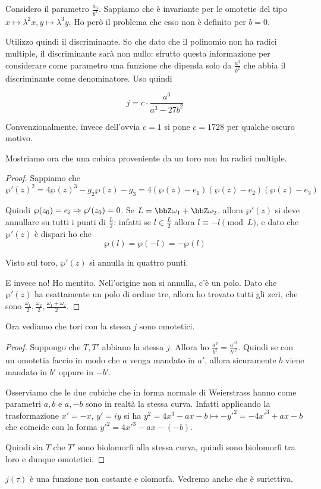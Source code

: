 	Considero il parametro $\frac{a_3}{b^2}$. Sappiamo che è invariante per le omotetie del tipo $x\mapsto \lambda^2x, y\mapsto\lambda^3y$. Ho però il problema che esso non è definito per $b=0$.

	Utilizzo quindi il discriminante. So che dato che il polinomio non ha radici multiple, il discriminante sarà non nullo: sfrutto questa informazione per considerare come parametro una funzione che dipenda solo da $\frac{a^3}{b^2}$ che abbia il discriminante come denominatore. Uso quindi
	
	\[
		j = c \cdot \frac {a^3}{a^3-27b^2}
	\]

	Convenzionalmente, invece dell'ovvia $c=1$ si pone $c=1728$ per qualche oscuro motivo.
	
	Mostriamo ora che una cubica proveniente da un toro non ha radici multiple.
	
	\begin{proof}
		Sappiamo che 
		\[
			\wp'(z)^2=4\wp(z)^3-g_2\wp(z)-g_3 = 4(\wp(z)-e_1)(\wp(z)-e_2)(\wp(z)-e_3)
		\]
		
		Quindi $\wp(z_0)=e_i \Rightarrow\wp'(z_0)=0$.
		Se $L=\bbZ\omega_1 + \bbZ\omega_2$, allora $\wp'(z)$ si deve annullare su tutti i punti di $\frac L2$: infatti se $l \in \frac L2$ allora $l \equiv -l \pmod L$, e dato che $\wp'(z)$ è dispari ho che 
		\[
			\wp(l) = \wp(-l) = -\wp(l)
		\]
		
		Visto sul toro, $\wp'(z)$ si annulla in quattro punti.
		
		E invece no! Ho mentito. Nell'origine non si annulla, c'è un polo. Dato che $\wp'(z)$ ha esattamente un polo di ordine tre, allora ho trovato tutti gli zeri, che sono $\frac{\omega_1}2, \frac{\omega_2}2, \frac{\omega_1+\omega_2}2$.
		

	\end{proof}

	Ora vediamo che tori con la stessa $j$ sono omotetici.
	
	\begin{proof}
          Suppongo che $T, T'$ abbiano la stessa $j$. Allora ho $\frac{a^3}{b^2}=\frac{a'^3}{b'^2}$. Quindi se con un omotetia faccio in modo che $a$ venga mandato in $a'$, allora sicuramente $b$ viene mandato in $b'$ oppure in $-b'$.

          Osserviamo che le due cubiche che in forma normale di Weierstrass hanno come parametri $a, b$ e $a, -b$ sono in realtà la stessa curva. Infatti applicando la trasformazione $x' = -x$, $y' = iy$ si ha $y^2 = 4x^3 - ax - b \mapsto - y'^2 = - 4x'^3 + ax - b$ che coincide con la forma $y'^2 = 4x'^3 - ax - (-b)$.
		
          Quindi sia $T$ che $T'$ sono biolomorfi alla stessa curva, quindi sono biolomorfi tra loro e dunque omotetici.
	\end{proof}
	
	\begin{osservazione}
		$j(\tau)$ è una funzione non costante e olomorfa. Vedremo anche che è suriettiva.
	\end{osservazione}

